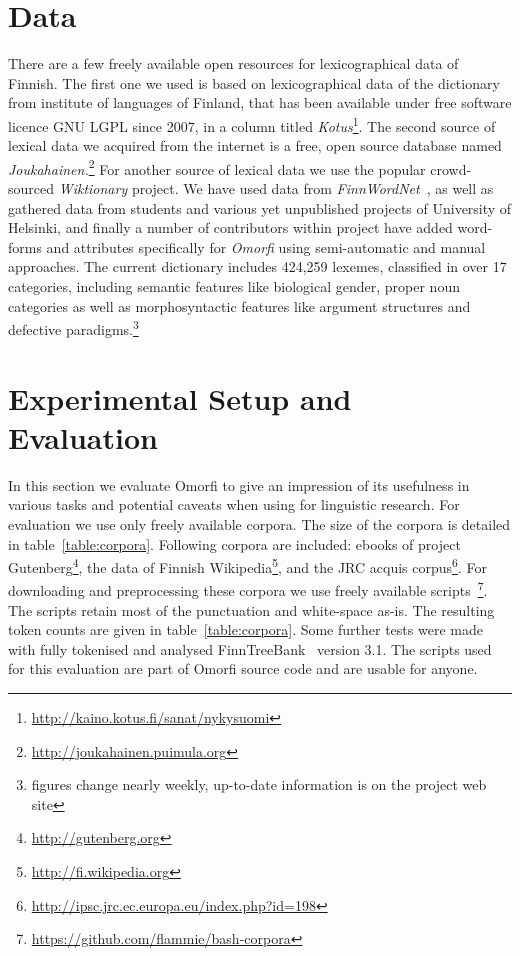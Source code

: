 \documentclass[a4paper,12pt]{article}
\begin{document}
\section{Data}
\label{sec:data}

There are a few freely available open resources for lexicographical data of
Finnish. The first one we used is based on lexicographical data of the
dictionary from institute of languages of Finland, that has been available
under free software licence GNU LGPL since 2007, in a column titled
\textit{Kotus}\footnote{\url{http://kaino.kotus.fi/sanat/nykysuomi}}.  The
second source of lexical data we acquired from the internet is a free, open
source database named
\textit{Joukahainen.}\footnote{\url{http://joukahainen.puimula.org}} For
another source of lexical data we use the popular crowd-sourced
\textit{Wiktionary} project.  We have used data from
\textit{FinnWordNet}~\citep{linden2010finnwordnet}, as well as gathered data
from students and various yet unpublished projects of University of Helsinki,
and finally a number of contributors within project have added word-forms and
attributes specifically for \textit{Omorfi} using semi-automatic and manual
approaches. The current dictionary includes 424,259 lexemes, classified in over
17 categories, including semantic features like biological gender, proper noun
categories as well as morphosyntactic features like argument structures and
defective paradigms.\footnote{figures change nearly weekly, up-to-date
information is on the project web site}



\section{Experimental Setup and Evaluation}
\label{sec:evaluation}

In this section we evaluate Omorfi to give an impression of its usefulness
in various tasks and potential caveats when using for linguistic research.
For evaluation we use only freely available corpora. The size of the corpora
is detailed in table~\ref{table:corpora}. Following corpora are included:
ebooks of project Gutenberg\footnote{\url{http://gutenberg.org}}, the data
of Finnish Wikipedia\footnote{\url{http://fi.wikipedia.org}}, and the JRC
acquis corpus\footnote{\url{http://ipsc.jrc.ec.europa.eu/index.php?id=198}}.
For downloading and preprocessing these corpora we use freely available
scripts~\footnote{\url{https://github.com/flammie/bash-corpora}}. The
scripts retain most of the punctuation and white-space as-is. The resulting
token counts are given in table~\ref{table:corpora}. Some further tests were
made with fully tokenised and analysed
FinnTreeBank~\citep{voutilainen2012specifying} version 3.1.  The scripts
used for this evaluation are part of Omorfi source code and are usable for
anyone.
\end{document}

